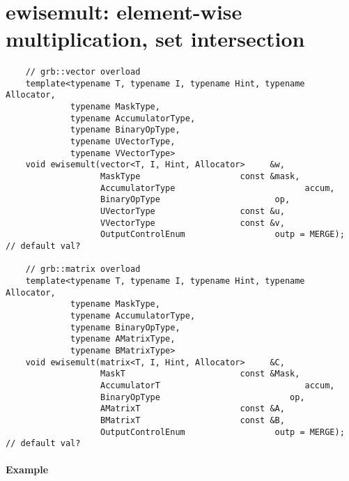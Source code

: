 \section{{\sf ewisemult}: element-wise multiplication, set intersection}

\paragraph{\syntax}

\begin{verbatim}
    // grb::vector overload
    template<typename T, typename I, typename Hint, typename Allocator,
             typename MaskType,
             typename AccumulatorType,
             typename BinaryOpType,
             typename UVectorType,
             typename VVectorType>
    void ewisemult(vector<T, I, Hint, Allocator>     &w,
                   MaskType                    const &mask,
                   AccumulatorType                          accum,
                   BinaryOpType                       op,
                   UVectorType                 const &u,
                   VVectorType                 const &v,
                   OutputControlEnum                  outp = MERGE);  // default val?

    // grb::matrix overload
    template<typename T, typename I, typename Hint, typename Allocator,
             typename MaskType,
             typename AccumulatorType,
             typename BinaryOpType,
             typename AMatrixType,
             typename BMatrixType>
    void ewisemult(matrix<T, I, Hint, Allocator>     &C,
                   MaskT                       const &Mask,
                   AccumulatorT                             accum,
                   BinaryOpType                          op,
                   AMatrixT                    const &A,
                   BMatrixT                    const &B,
                   OutputControlEnum                  outp = MERGE);  // default val?
\end{verbatim}


\paragraph{Example}

\begin{verbatim}

\end{verbatim}


